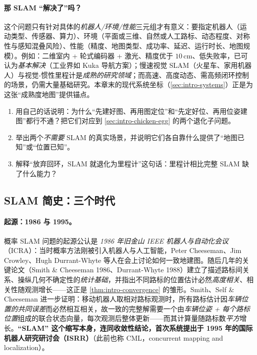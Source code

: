 \paragraph{那 SLAM “解决了”吗？}
这个问题只有针对具体的\emph{机器人/环境/性能}三元组才有意义\cite{cadena2016past}：要指定机器人（运动类型、传感器、算力）、环境（平面或三维、自然或人工路标、动态程度、对称性与感知混叠风险）、性能（精度、地图类型、成功率、延迟、运行时长、地图规模）。例如：二维室内 + 轮式编码器 + 激光、精度优于 $10\,$cm、低失败率，已可认为\emph{基本解决}（工业界如 Kuka 导航方案）；慢速视觉 SLAM（火星车、家用机器人）与视觉-惯性里程计是\emph{成熟的研究领域}；而高速、高度动态、需高频闭环控制的场景，仍需大量基础研究。本章末的现代系统坐标（\cref{sec:intro-systems}）正是为这张“成熟度地图”提供锚点。

\begin{practice}
\begin{enumerate}
  \item 用自己的话说明：为什么“先建好图、再用图定位”和“先定好位、再用位姿建图”都行不通？把它们对应到 \cref{sec:intro-chicken-egg} 的两个退化子问题。
  \item 举出两个\emph{不需要} SLAM 的真实场景，并说明它们各自靠什么提供了“地图已知”或“位置已知”。
  \item 解释“放弃回环，SLAM 就退化为里程计”这句话：里程计相比完整 SLAM 缺了什么能力？
\end{enumerate}
\end{practice}

\subsection{SLAM 简史：三个时代}
\label{sec:intro-history}

\paragraph{起源：1986 与 1995。}
概率 SLAM 问题的起源公认是 \emph{1986 年旧金山 IEEE 机器人与自动化会议}（ICRA）：当时概率方法刚被引入机器人与人工智能，Peter Cheeseman、Jim Crowley、Hugh Durrant-Whyte 等人在会上讨论如何一致地建图\cite{durrantwhyte2006slam}。随后几年的关键论文（Smith \& Cheeseman 1986、Durrant-Whyte 1988）建立了描述路标间关系、操纵几何不确定性的\emph{统计基础}，并指出不同路标的位置估计必然\emph{高度相关}、相关性随观测增长——这正是 \cref{thm:intro-convergence} 的雏形。Smith、Self \& Cheeseman 进一步证明：移动机器人取相对路标观测时，所有路标估计因\emph{车辆位置的共同误差}而必然相互相关，故一致的完整解需要一个由\emph{车辆位姿 + 每个路标位置}组成的联合状态向量，每次观测后整体更新——而其计算量随路标数\emph{平方}增长\cite{durrantwhyte2006slam}。\textbf{“SLAM” 这个缩写本身，连同收敛性结论，首次系统提出于 1995 年的国际机器人研究研讨会（ISRR）}\cite{durrantwhyte2006slam}（此前也称 CML，concurrent mapping and localization）。

